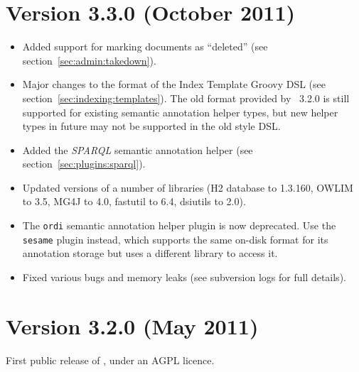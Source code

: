 \section{Version 3.3.0 (October 2011)}

\begin{itemize}
\item Added support for marking documents as ``deleted'' (see
section~\ref{sec:admin:takedown}).

\item Major changes to the format of the Index Template Groovy DSL (see
section~\ref{sec:indexing:templates}).  The old format provided by \Mimir\
3.2.0 is still supported for existing semantic annotation helper types, but
new helper types in future may not be supported in the old style DSL.

\item Added the {\em SPARQL} semantic annotation helper (see
section~\ref{sec:plugins:sparql}).

\item Updated versions of a number of libraries (H2 database to 1.3.160, OWLIM
to 3.5, MG4J to 4.0, fastutil to 6.4, dsiutils to 2.0).

\item The \verb|ordi| semantic annotation helper plugin is now deprecated.  Use
the \verb|sesame| plugin instead, which supports the same on-disk format for
its annotation storage but uses a different library to access it.

\item Fixed various bugs and memory leaks (see subversion logs for full
details).

\end{itemize}

\section{Version 3.2.0 (May 2011)}

First public release of \Mimir, under an AGPL licence.

